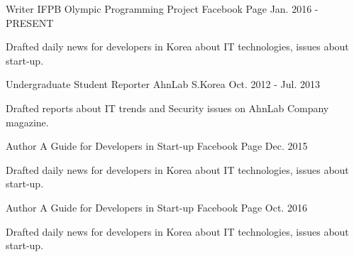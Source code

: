 \begin{cventries}
  \cventry
    {Writer} %
    {IFPB Olympic Programming Project} %
    {Facebook Page} %
    {Jan. 2016 - PRESENT} %
    {
      \begin{cvitems} %
        \item {Drafted daily news for developers in Korea about IT technologies, issues about start-up.}
      \end{cvitems}
    }

  \cventry
    {Undergraduate Student Reporter} %
    {AhnLab} %
    {S.Korea} %
    {Oct. 2012 - Jul. 2013} %
    {
      \begin{cvitems} %
        \item {Drafted reports about IT trends and Security issues on AhnLab Company magazine.}
      \end{cvitems}
    }

  \cventry
    {Author} %
    {A Guide for Developers in Start-up} %
    {Facebook Page} %
    {Dec. 2015} %
    {
      \begin{cvitems} %
        \item {Drafted daily news for developers in Korea about IT technologies, issues about start-up.}
      \end{cvitems}
    }
    
  \cventry
    {Author} %
    {A Guide for Developers in Start-up} %
    {Facebook Page} %
    {Oct. 2016} %
    {
      \begin{cvitems} %
        \item {Drafted daily news for developers in Korea about IT technologies, issues about start-up.}
      \end{cvitems}
    }
\end{cventries}
